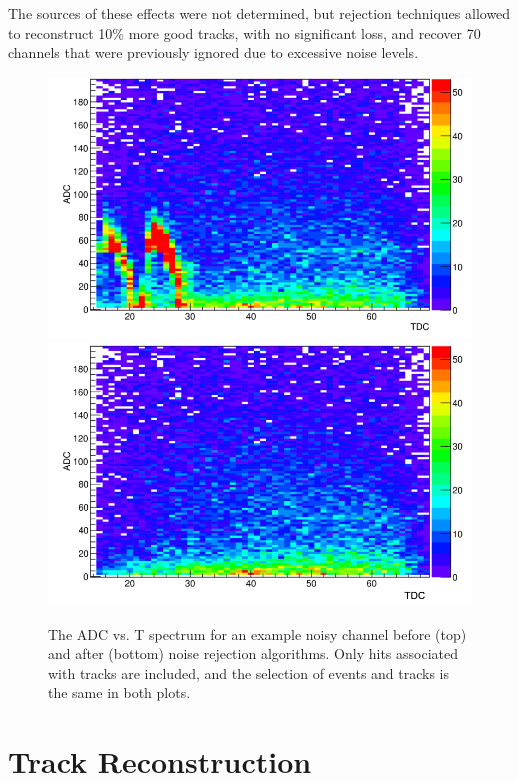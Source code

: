 \documentclass[twocolumn,showpacs,superscriptaddress,groupedaddress]{revtex4}
\begin{document}
The sources of these effects were not determined, but rejection techniques allowed to reconstruct 10\% more good tracks, with no significant loss, and recover 70 channels that were previously ignored due to excessive noise levels.

\begin{figure}[tb]\centering
\includegraphics[scale=0.27]{fig/noisy_pad_before_rejection2.png}
\includegraphics[scale=0.27]{fig/noisy_pad_after_rejection2.png}
\caption{The ADC vs. T spectrum for an example noisy channel before (top) and after (bottom) noise rejection algorithms.  Only hits associated with tracks are included, and the selection of events and tracks is the same in both plots.}
\label{fig:noise}
\end{figure}

\section{Track Reconstruction}\label{sec_perf}
\end{document}
